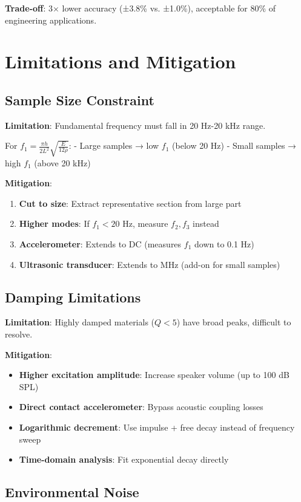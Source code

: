 \documentclass[12pt,a4paper]{article}
\begin{document}
\textbf{Trade-off}: 3× lower accuracy (±3.8\% vs. ±1.0\%), acceptable for 80\% of engineering applications.

\section{Limitations and Mitigation}

\subsection{Sample Size Constraint}

\textbf{Limitation}: Fundamental frequency must fall in 20 Hz-20 kHz range.

For $f_1 = \frac{\pi h}{2L^2}\sqrt{\frac{E}{12\rho}}$:
- Large samples → low $f_1$ (below 20 Hz)
- Small samples → high $f_1$ (above 20 kHz)

\textbf{Mitigation}:
\begin{enumerate}
\item \textbf{Cut to size}: Extract representative section from large part
\item \textbf{Higher modes}: If $f_1 < 20$ Hz, measure $f_2, f_3$ instead
\item \textbf{Accelerometer}: Extends to DC (measures $f_1$ down to 0.1 Hz)
\item \textbf{Ultrasonic transducer}: Extends to MHz (add-on for small samples)
\end{enumerate}

\subsection{Damping Limitations}

\textbf{Limitation}: Highly damped materials ($Q < 5$) have broad peaks, difficult to resolve.

\textbf{Mitigation}:
\begin{itemize}
\item \textbf{Higher excitation amplitude}: Increase speaker volume (up to 100 dB SPL)
\item \textbf{Direct contact accelerometer}: Bypass acoustic coupling losses
\item \textbf{Logarithmic decrement}: Use impulse + free decay instead of frequency sweep
\item \textbf{Time-domain analysis}: Fit exponential decay directly
\end{itemize}

\subsection{Environmental Noise}
\end{document}
